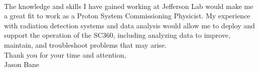 \documentclass[12pt,letterpaper]{article}
\begin{document}
\paragraph{}The knowledge and skills I have gained working at Jefferson Lab would make me a great fit to work as a Proton System Commissioning Physicist. My experience with radiation detection systems and data analysis would allow me to deploy and support the operation of the SC360, including analyzing data to improve, maintain, and troubleshoot problems that may arise. 
\\

\noindent Thank you for your time and attention,\\
\noindent Jason Bane
\end{document}
